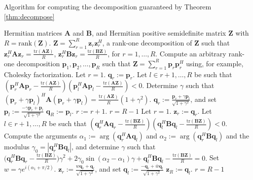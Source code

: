\documentclass[twocolumn,10pt]{IEEEtran}
\theoremstyle{plain} \newtheorem{theorem}{Theorem}
\theoremstyle{plain} \newtheorem{proposition}{Proposition}
\theoremstyle{plain} \newtheorem{corollary}{Corollary}
\theoremstyle{remark} \newtheorem{remark}{Remark}
\theoremstyle{remark} \newtheorem{lemma}{Lemma}
\theoremstyle{plain} \newtheorem{definition}{Definition}
\theoremstyle{plain} \newtheorem{assumption}{Assumption}
\theoremstyle{plain} \newtheorem{fact}{Fact}
\begin{document}
\begin{algorithm}
\caption{Algorithm for computing the decomposition guaranteed by Theorem \ref{thm:decompose}}\label{alg:1}
\begin{algorithmic}[1]
\REQUIRE Hermitian matrices  $\mathbf{A}$ and $\mathbf{B}$, and Hermitian positive semidefinite matrix $\mathbf{Z}$ with $R=\mathrm{rank}(\mathbf{Z})$.
\ENSURE $\mathbf{Z}=\sum_{r=1}^R \mathbf{z}_r\mathbf{z}_r^H$, a rank-one decomposition of $\mathbf{Z}$ such that $\mathbf{z}_r^H\mathbf{A}\mathbf{z}_r=\frac{\mathrm{tr}(\mathbf{AZ})}{R}$, $\mathbf{z}_r^H\mathbf{B}\mathbf{z}_r=\frac{\mathrm{tr}(\mathbf{BZ})}{R}$, for $r=1,\ldots,R$.
\STATE Compute an arbitrary rank-one decomposition $\mathbf{p}_1, \mathbf{p}_2, \ldots, \mathbf{p}_R$ such that $\mathbf{Z}=\sum_{r=1}^R \mathbf{p}_r\mathbf{p}_r^H$ using, for example, Cholesky factorization.
\STATE Let $r=1$.
\REPEAT
{}
\STATE $\mathbf{q}_r:=\mathbf{p}_r$.
\ELSE
\STATE Let $l\in{r+1,\ldots,R}$ be such that $(\mathbf{p}_r^H\mathbf{A}\mathbf{p}_r-\frac{\mathrm{tr}(\mathbf{AZ})}{R})(\mathbf{p}_l^H\mathbf{A}\mathbf{p}_l-\frac{\mathrm{tr}(\mathbf{AZ})}{R})<0$.
\STATE Determine $\gamma$ such that $(\mathbf{p}_r+\gamma\mathbf{p}_l)^H\mathbf{A}(\mathbf{p}_r+\gamma\mathbf{p}_l)=\frac{\mathrm{tr}(\mathbf{AZ})}{R}(1+\gamma^2)$.
\STATE $\mathbf{q}_r:=\frac{\mathbf{p}_r+\gamma\mathbf{p}_l}{\sqrt{1+\gamma^2}}$, and set $\mathbf{p}_l:=\frac{-\gamma\mathbf{p}_r+\mathbf{p}_l}{\sqrt{1+\gamma^2}}$
\ENDIF
{}
\STATE $\mathbf{q}_R:=\mathbf{p}_l$.
\ENDIF
\STATE $r:=r+1$.
\UNTIL $r=R-1$ 
\STATE Let $r=1$.
\REPEAT
{}
\STATE $\mathbf{z}_r:=\mathbf{q}_r$.
\ELSE
\STATE Let $l\in{r+1,\ldots,R}$ be such that $(\mathbf{q}_r^H\mathbf{A}\mathbf{q}_r-\frac{\mathrm{tr}(\mathbf{BZ})}{R})(\mathbf{q}_l^H\mathbf{B}\mathbf{q}_l-\frac{\mathrm{tr}(\mathbf{BZ})}{R})<0$.
\STATE Compute the arguments $\alpha_1:=\arg(\mathbf{q}_r^H\mathbf{A}\mathbf{q}_l)$ and $\alpha_2:=\arg(\mathbf{q}_r^H\mathbf{B}\mathbf{q}_l)$ and the modulus $\gamma_0=|\mathbf{q}_r^H\mathbf{B}\mathbf{q}_l|$, and determine $\gamma$ such that
$
\big(\mathbf{q}_r^H\mathbf{B}\mathbf{q}_r-\frac{\mathrm{tr}(\mathbf{BZ})}{R}\big)\gamma^2+2\gamma_0\sin(\alpha_2-\alpha_1)\gamma+\mathbf{q}_l^H\mathbf{B}\mathbf{q}_l-\frac{\mathrm{tr}(\mathbf{BZ})}{R}=0. $
\STATE Set $w=\gamma e^{i(\alpha_1+\pi/2)}$.
\STATE $\mathbf{z}_r:=\frac{w\mathbf{q}_r+\mathbf{q}_l}{\sqrt{1+\gamma^2}}$, and set $\mathbf{q}_l:=\frac{-\mathbf{q}_r+\bar{w}\mathbf{q}_l}{\sqrt{1+\gamma^2}}$
\ENDIF
{}
\STATE $\mathbf{z}_R:=\mathbf{q}_l$.
\ENDIF
\UNTIL $r=R-1$
\end{algorithmic}
\end{algorithm}
\end{document}

